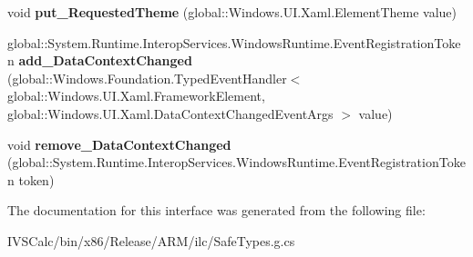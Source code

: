 \begin{DoxyCompactItemize}
void {\bfseries put\+\_\+\+Requested\+Theme} (global\+::\+Windows.\+U\+I.\+Xaml.\+Element\+Theme value)
\item 
\mbox{\label{interface_windows_1_1_u_i_1_1_xaml_1_1_i_framework_element2_a204d781ea5edc2c05e9d47534d5027ae}} 
global\+::\+System.\+Runtime.\+Interop\+Services.\+Windows\+Runtime.\+Event\+Registration\+Token {\bfseries add\+\_\+\+Data\+Context\+Changed} (global\+::\+Windows.\+Foundation.\+Typed\+Event\+Handler$<$ global\+::\+Windows.\+U\+I.\+Xaml.\+Framework\+Element, global\+::\+Windows.\+U\+I.\+Xaml.\+Data\+Context\+Changed\+Event\+Args $>$ value)
\item 
\mbox{\label{interface_windows_1_1_u_i_1_1_xaml_1_1_i_framework_element2_a04219d0d5da2859d2265a4df37e64985}} 
void {\bfseries remove\+\_\+\+Data\+Context\+Changed} (global\+::\+System.\+Runtime.\+Interop\+Services.\+Windows\+Runtime.\+Event\+Registration\+Token token)
\end{DoxyCompactItemize}


The documentation for this interface was generated from the following file\+:\begin{DoxyCompactItemize}
\item 
I\+V\+S\+Calc/bin/x86/\+Release/\+A\+R\+M/ilc/Safe\+Types.\+g.\+cs\end{DoxyCompactItemize}
